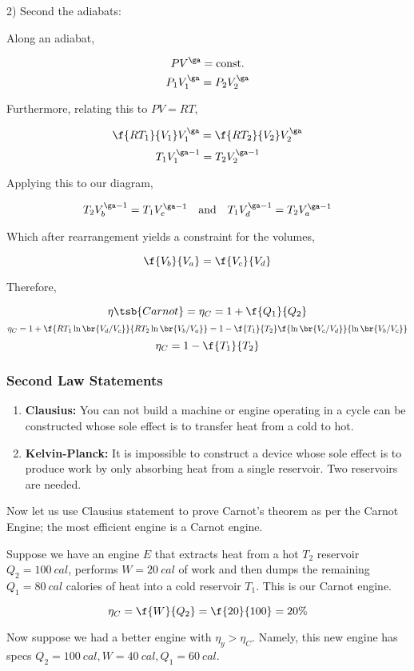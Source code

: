 \documentclass{article}
\begin{document}
2) Second the adiabats:

Along an adiabat,

\[ PV^{\ga} = \text{const.}\]
\[ P_1V_1^{\ga} = P_2V_2^{\ga} \]

Furthermore, relating this to $PV = RT$,

\[ \f{RT_1}{V_1} V_1^{\ga} = \f{RT_2}{V_2} V_2^{\ga} \]
\[ T_1 V_1^{\ga-1} = T_2 V_2^{\ga-1} \]

Applying this to our diagram,

\[ T_2 V_b^{\ga-1} = T_1 V_c^{\ga-1} \quad \text{and} \quad T_1 V_d^{\ga-1} = T_2 V_a^{\ga-1} \]

Which after rearrangement yields a constraint for the volumes,

\[ \f{V_b}{V_a} = \f{V_c}{V_d} \]

Therefore,

\[ \eta\tsb{Carnot} = \eta_C = 1 + \f{Q_1}{Q_2} \]
\[ \eta_C = 1 + \f{RT_1\ln\br{V_d/V_c}}{RT_2\ln\br{V_b/V_a}} = 1 - \f{T_1}{T_2}\f{\ln\br{V_c/V_d}}{\ln\br{V_b/V_c}} \]
\[ \eta_C = 1 - \f{T_1}{T_2} \]

\subsubsection{Second Law Statements}

\begin{enumerate}
  \item \textbf{Clausius:} You can not build a machine or engine operating in a cycle can be constructed whose sole effect is to transfer heat from a cold to hot.
  \item \textbf{Kelvin-Planck:} It is impossible to construct a device whose sole effect is to produce work by only absorbing heat from a single reservoir. Two reservoirs are needed.
\end{enumerate}

Now let us use Clausius statement to prove Carnot's theorem as per the Carnot Engine; the most efficient engine is a Carnot engine.


Suppose we have an engine $E$ that extracts heat from a hot $T_2$ reservoir $Q_2 = \SI{100}{cal}$, performs $W = \SI{20}{cal}$ of work and then dumps the remaining $Q_1 = \SI{80}{cal}$ calories of heat into a cold reservoir $T_1$. This is our Carnot engine.

\[ \eta_C = \f{W}{Q_2} = \f{20}{100} = 20\% \]

Now suppose we had a better engine with $\eta_y > \eta_C$. Namely, this new engine has specs $Q_2 = \SI{100}{cal}, W = \SI{40}{cal}, Q_1 = \SI{60}{cal}$.
\end{document}

